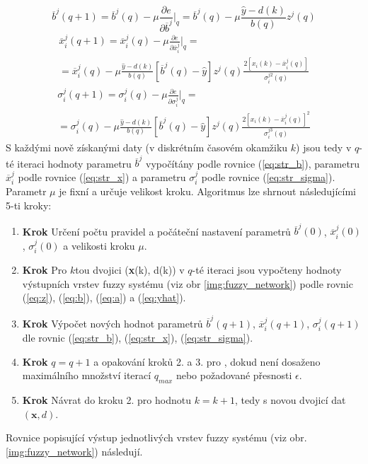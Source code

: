 \begin{equation}\label{eq:str_b}
    \overline{b}^j(q+1)=\overline{b}^j(q)-\mu\frac{\partial e}{\partial \overline{b}^j}\Big|_q=\overline{b}^j(q)-\mu\frac{\hat{y}-d(k)}{b(q)}z^j(q)
\end{equation}
\begin{multline}\label{eq:str_x}
    \overline{x}_i^j(q+1)=\overline{x}_i^j(q)-\mu\frac{\partial e}{\partial \overline{x}_i^j}\Big|_q=\\ =\overline{x}_i^j(q)-\mu\frac{\hat{y}-d(k)}{b(q)}[\overline{b}^j(q)-\hat{y}]z^j(q)\frac{2[x_i(k)-\overline{x}_i^j(q)]}{\sigma_i^{j2}(q)}
\end{multline}
\begin{multline}\label{eq:str_sigma}
        \sigma_i^j(q+1)=\sigma_i^j(q)-\mu\frac{\partial e}{\partial \sigma_i^j}\Big|_q=\\= \sigma_i^j(q)-\mu\frac{\hat{y}-d(k)}{b(q)}[\overline{b}^j(q)-\hat{y}]z^j(q)\frac{2[x_i(k)-\overline{x}_i^j(q)]^2}{\sigma_i^{j3}(q)}
\end{multline}
S každými nově získanými daty (v diskrétním časovém okamžiku $k$) jsou tedy v $q$-té iteraci hodnoty parametru $\overline{b}^j$ vypočítány podle rovnice (\ref{eq:str_b}), parametru $\overline{x}_i^j$ podle rovnice (\ref{eq:str_x}) a parametru $\sigma_i^j$ podle rovnice (\ref{eq:str_sigma}). Parametr $\mu$ je fixní a určuje velikost kroku. 
Algoritmus lze shrnout následujícími 5-ti kroky:
\begin{enumerate}[\bfseries 1.]
        \item \textbf{Krok} Určení počtu pravidel a počáteční nastavení parametrů $\overline{b}^j(0)$, $\overline{x}_i^j(0)$, $\sigma_i^j(0)$ a velikosti kroku $\mu$.
        \item \textbf{Krok} Pro $k$tou dvojici (\textbf{x}(k), d(k)) v $q$-té iteraci jsou vypočteny hodnoty výstupních vrstev fuzzy systému (viz obr \ref{img:fuzzy_network}) podle rovnic (\ref{eq:z}), (\ref{eq:b}), (\ref{eq:a}) a (\ref{eq:yhat}).
        \item \textbf{Krok} Výpočet nových hodnot parametrů $\overline{b}^j(q+1)$, $\overline{x}_i^j(q+1)$, $\sigma_i^j(q+1)$ dle rovnic (\ref{eq:str_b}), (\ref{eq:str_x}), (\ref{eq:str_sigma}).
        \item \textbf{Krok} $q=q+1$ a opakování kroků 2. a 3. pro , dokud není dosaženo maximálního množství iterací $q_{max}$ nebo požadované přesnosti $\epsilon$.
        \item \textbf{Krok} Návrat do kroku 2. pro hodnotu $k=k+1$, tedy s novou dvojicí dat $(\textbf{x}, d)$.
    \end{enumerate}
Rovnice popisující výstup jednotlivých vrstev fuzzy systému (viz obr. \ref{img:fuzzy_network}) následují.

